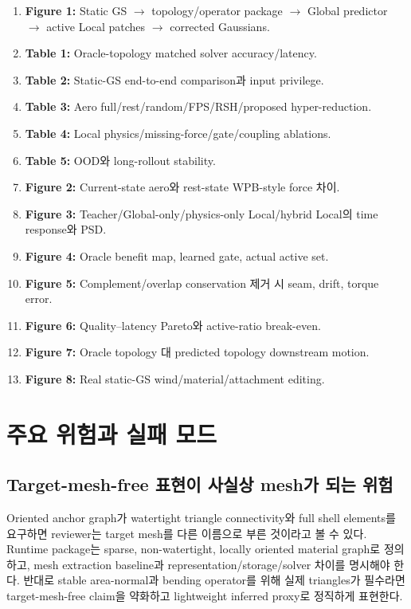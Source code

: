 \documentclass[11pt,a4paper]{article}
\begin{document}
\begin{enumerate}[leftmargin=1.7em]
  \item \textbf{Figure 1:} Static GS \(\rightarrow\) topology/operator package
  \(\rightarrow\) Global predictor \(\rightarrow\) active Local patches
  \(\rightarrow\) corrected Gaussians.
  \item \textbf{Table 1:} Oracle-topology matched solver accuracy/latency.
  \item \textbf{Table 2:} Static-GS end-to-end comparison과 input privilege.
  \item \textbf{Table 3:} Aero full/rest/random/FPS/RSH/proposed hyper-reduction.
  \item \textbf{Table 4:} Local physics/missing-force/gate/coupling ablations.
  \item \textbf{Table 5:} OOD와 long-rollout stability.
  \item \textbf{Figure 2:} Current-state aero와 rest-state WPB-style force 차이.
  \item \textbf{Figure 3:} Teacher/Global-only/physics-only Local/hybrid Local의 time response와 PSD.
  \item \textbf{Figure 4:} Oracle benefit map, learned gate, actual active set.
  \item \textbf{Figure 5:} Complement/overlap conservation 제거 시 seam, drift, torque error.
  \item \textbf{Figure 6:} Quality--latency Pareto와 active-ratio break-even.
  \item \textbf{Figure 7:} Oracle topology 대 predicted topology downstream motion.
  \item \textbf{Figure 8:} Real static-GS wind/material/attachment editing.
\end{enumerate}

\section{주요 위험과 실패 모드}

\subsection{Target-mesh-free 표현이 사실상 mesh가 되는 위험}

Oriented anchor graph가 watertight triangle connectivity와 full shell elements를 요구하면
reviewer는 target mesh를 다른 이름으로 부른 것이라고 볼 수 있다.
Runtime package는 sparse, non-watertight, locally oriented material graph로 정의하고,
mesh extraction baseline과 representation/storage/solver 차이를 명시해야 한다.
반대로 stable area-normal과 bending operator를 위해 실제 triangles가 필수라면
target-mesh-free claim을 약화하고 lightweight inferred proxy로 정직하게 표현한다.
\end{document}
